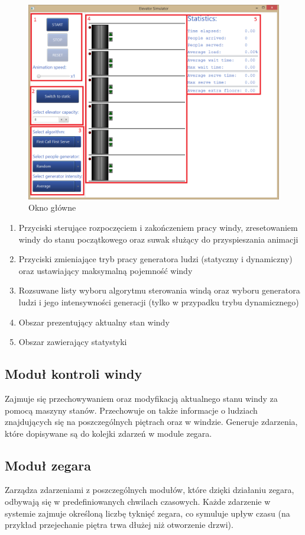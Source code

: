 \documentclass[a4paper,11pt]{article}
\begin{document}
\begin{figure}[H]
    \centering
    \caption{Okno główne}
    \includegraphics[width=\textwidth]{okno.png}
\end{figure}

\begin{enumerate}
	\item Przyciski sterujące rozpoczęciem i zakończeniem pracy windy, zresetowaniem windy do stanu początkowego oraz suwak służący do przyspieszania animacji
	\item Przyciski zmieniające tryb pracy generatora ludzi (statyczny i dynamiczny) oraz ustawiający maksymalną pojemność windy
	\item Rozsuwane listy wyboru algorytmu sterowania windą oraz wyboru generatora ludzi i jego intensywności generacji (tylko w przypadku trybu dynamicznego)
	\item Obszar prezentujący aktualny stan windy
	\item Obszar zawierający statystyki
\end{enumerate}
\subsection{Moduł kontroli windy}
Zajmuje się przechowywaniem oraz modyfikacją aktualnego stanu windy za pomocą maszyny stanów. Przechowuje on także informacje o ludziach znajdujących się na poszczególnych piętrach oraz w windzie.  Generuje zdarzenia, które dopisywane są do kolejki zdarzeń w module zegara.
\subsection{Moduł zegara}
Zarządza zdarzeniami z poszczególnych modułów, które dzięki działaniu zegara, odbywają się w predefiniowanych chwilach czasowych. Każde zdarzenie w systemie zajmuje określoną liczbę tyknięć zegara, co symuluje upływ czasu (na przykład przejechanie piętra trwa dłużej niż otworzenie drzwi).
\end{document}
